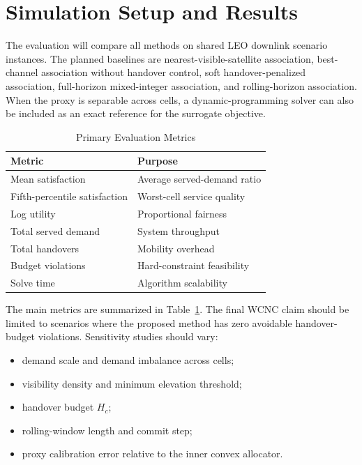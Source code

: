 
\section{Simulation Setup and Results}

The evaluation will compare all methods on shared LEO downlink scenario
instances. The planned baselines are nearest-visible-satellite association,
best-channel association without handover control, soft handover-penalized
association, full-horizon mixed-integer association, and rolling-horizon
association. When the proxy is separable across cells, a dynamic-programming
solver can also be included as an exact reference for the surrogate objective.

\begin{table}[t]
\caption{Primary Evaluation Metrics}
\label{tab:metrics}
\centering
\begin{tabular}{ll}
\toprule
Metric & Purpose \\
\midrule
Mean satisfaction & Average served-demand ratio \\
Fifth-percentile satisfaction & Worst-cell service quality \\
Log utility & Proportional fairness \\
Total served demand & System throughput \\
Total handovers & Mobility overhead \\
Budget violations & Hard-constraint feasibility \\
Solve time & Algorithm scalability \\
\bottomrule
\end{tabular}
\end{table}

The main metrics are summarized in Table~\ref{tab:metrics}. The final WCNC
claim should be limited to scenarios where the proposed method has zero
avoidable handover-budget violations. Sensitivity studies should vary:
\begin{itemize}
\item demand scale and demand imbalance across cells;
\item visibility density and minimum elevation threshold;
\item handover budget $H_c$;
\item rolling-window length and commit step;
\item proxy calibration error relative to the inner convex allocator.
\end{itemize}
